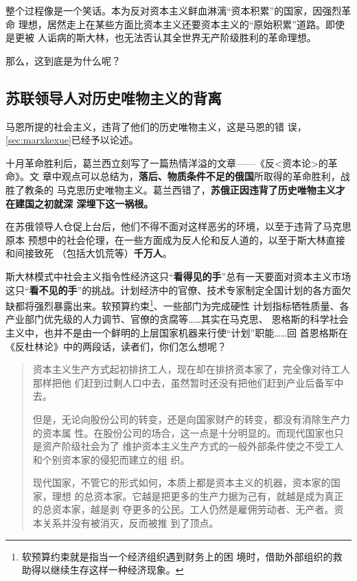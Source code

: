 整个过程像是一个笑话。本为反对资本主义鲜血淋漓“资本积累”的国家，因强烈革命
理想，居然走上在某些方面比资本主义还要资本主义的“原始积累”道路。即使是更被
人诟病的斯大林，也无法否认其全世界无产阶级胜利的革命理想。

那么，这到底是为什么呢？

\subsection{苏联领导人对历史唯物主义的背离}
\label{sec:beili}

马恩所提的社会主义，违背了他们的历史唯物主义，这是马恩的错
误，\cref{sec:marxkexue}已经予以论述。

十月革命胜利后，葛兰西立刻写了一篇热情洋溢的文章——《反<资本论>的革命》。文
章中观点可以总结为，\textbf{落后、物质条件不足的俄国}所取得的革命胜利，战胜了教条的
马克思历史唯物主义。葛兰西错了，\textbf{苏俄正因违背了历史唯物主义才在建国之初就深
  深埋下这一祸根。}

在苏俄领导人仓促上台后，他们不得不面对这样恶劣的环境，以至于违背了马克思原本
预想中的社会伦理，在一些方面成为反人伦和反人道的，以至于斯大林直接和间接致死
（包括大饥荒等）\textbf{千万人}。

斯大林模式中社会主义指令性经济这只“\textbf{看得见的手}”总有一天要面对资本主义市场
这只“\textbf{看不见的手}”的挑战。计划经济中的官僚、技术专家制定全国计划的各方面欠
缺都将强烈暴露出来。软预算约束\footnote{软预算约束就是指当一个经济组织遇到财务上的困
  境时，借助外部组织的救助得以继续生存这样一种经济现象。}、一些部门为完成硬性
计划指标牺牲质量、各产业部门优先级的人力调节、官僚的贪腐等……其实在马克思、
恩格斯的科学社会主义中，也并不是由一个鲜明的上层国家机器来行使“计划”职能……回
首恩格斯在《反杜林论》中的两段话，读者们，你们怎么想呢？
\begin{quotation}
  资本主义生产方式起初排挤工人，现在却在排挤资本家了，完全像对待工人那样把他
  们赶到过剩人口中去，虽然暂时还没有把他们赶到产业后备军中去。

  但是，无论向股份公司的转变，还是向国家财产的转变，都没有消除生产力的资本属
  性。在股份公司的场合，这一点是十分明显的。而现代国家也只是资产阶级社会为了
  维护资本主义生产方式的一般外部条件使之不受工人和个别资本家的侵犯而建立的组
  织。

  现代国家，不管它的形式如何，本质上都是资本主义的机器，资本家的国家，理想
  的总资本家。它越是把更多的生产力据为己有，就越是成为真正的总资本家，越是剥
  夺更多的公民。工人仍然是雇佣劳动者、无产者。资本关系并没有被消灭，反而被推
  到了顶点。
\end{quotation}

